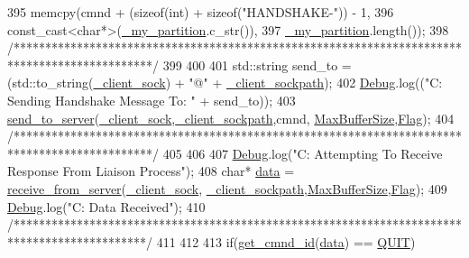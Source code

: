 \begin{DoxyCode}
395     memcpy(cmnd + (\textcolor{keyword}{sizeof}(\textcolor{keywordtype}{int}) + \textcolor{keyword}{sizeof}(\textcolor{stringliteral}{"HANDSHAKE-"})) - 1,
396            const\_cast<char*>(\mbox{\hyperlink{class_c_l_i_aa58101a66621f7b2b64d4e566ad7bd89}{\_my\_partition}}.c\_str()),
397            \mbox{\hyperlink{class_c_l_i_aa58101a66621f7b2b64d4e566ad7bd89}{\_my\_partition}}.length());
398     \textcolor{comment}{/**********************************************************************************************/}
399 
400 
401     std::string send\_to = (std::to\_string(\mbox{\hyperlink{class_c_l_i_a89c215687bff66a3e0359a17bac3657d}{\_client\_sock}}) + \textcolor{stringliteral}{"@"} + 
      \mbox{\hyperlink{class_c_l_i_ad3b7579608f8c2e1d4c01a8668f701d9}{\_client\_sockpath}});
402     \mbox{\hyperlink{_cli_8h_ab6d95a4e6a59b4ad033ed3af31d878e0}{Debug}}.log((\textcolor{stringliteral}{"C: Sending Handshake Message To: "} + send\_to));
403     \mbox{\hyperlink{cli__helper_8hpp_a17a8dc79ae7d148b9eebc9698d404aa5}{send\_to\_server}}(\mbox{\hyperlink{class_c_l_i_a89c215687bff66a3e0359a17bac3657d}{\_client\_sock}},\mbox{\hyperlink{class_c_l_i_ad3b7579608f8c2e1d4c01a8668f701d9}{\_client\_sockpath}},cmnd,
      \mbox{\hyperlink{_cli_8h_a97a33a33e5428e13cfa0eff5ba0e846f}{MaxBufferSize}},\mbox{\hyperlink{_cli_8h_a1ca03d8f367ec7987b5a7321fe82e23e}{Flag}});
404     \textcolor{comment}{/**********************************************************************************************/}
405 
406 
407     \mbox{\hyperlink{_cli_8h_ab6d95a4e6a59b4ad033ed3af31d878e0}{Debug}}.log(\textcolor{stringliteral}{"C: Attempting To Receive Response From Liaison Process"});
408     \textcolor{keywordtype}{char}* \mbox{\hyperlink{daemon_8h_a85eb9d2878279de5fcb3000467c81af7}{data}} = \mbox{\hyperlink{cli__helper_8hpp_a9a7850489cf50a8693b388acc259ccaa}{receive\_from\_server}}(\mbox{\hyperlink{class_c_l_i_a89c215687bff66a3e0359a17bac3657d}{\_client\_sock}},
      \mbox{\hyperlink{class_c_l_i_ad3b7579608f8c2e1d4c01a8668f701d9}{\_client\_sockpath}},\mbox{\hyperlink{_cli_8h_a97a33a33e5428e13cfa0eff5ba0e846f}{MaxBufferSize}},\mbox{\hyperlink{_cli_8h_a1ca03d8f367ec7987b5a7321fe82e23e}{Flag}});
409     \mbox{\hyperlink{_cli_8h_ab6d95a4e6a59b4ad033ed3af31d878e0}{Debug}}.log(\textcolor{stringliteral}{"C: Data Received"});
410     \textcolor{comment}{/*********************************************************************************************/}
411 
412 
413     \textcolor{keywordflow}{if}(\mbox{\hyperlink{cli__helper_8hpp_a9caf20ba13e1adbc3e58c175a9b11fc0}{get\_cmnd\_id}}(\mbox{\hyperlink{daemon_8h_a85eb9d2878279de5fcb3000467c81af7}{data}}) == \mbox{\hyperlink{_command_codes_8h_a3c18e64ca07cf21278f4189cd4c2732f}{QUIT}})

\end{DoxyCode}
